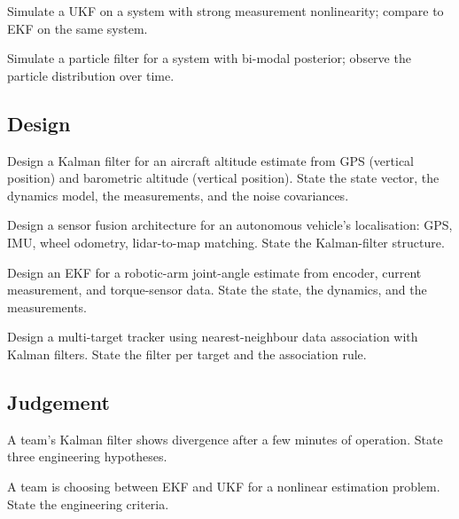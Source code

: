 \begin{exercise}
Simulate a UKF on a system with strong measurement nonlinearity; compare to EKF on the same system.
\end{exercise}

\begin{exercise}
Simulate a particle filter for a system with bi-modal posterior; observe the particle distribution over time.
\end{exercise}

\subsection*{Design}

\begin{exercise}
Design a Kalman filter for an aircraft altitude estimate from GPS (vertical position) and barometric altitude (vertical position). State the state vector, the dynamics model, the measurements, and the noise covariances.
\end{exercise}

\begin{exercise}
Design a sensor fusion architecture for an autonomous vehicle's localisation: GPS, IMU, wheel odometry, lidar-to-map matching. State the Kalman-filter structure.
\end{exercise}

\begin{exercise}
Design an EKF for a robotic-arm joint-angle estimate from encoder, current measurement, and torque-sensor data. State the state, the dynamics, and the measurements.
\end{exercise}

\begin{exercise}
Design a multi-target tracker using nearest-neighbour data association with Kalman filters. State the filter per target and the association rule.
\end{exercise}

\subsection*{Judgement}

\begin{exercise}
A team's Kalman filter shows divergence after a few minutes of operation. State three engineering hypotheses.
\end{exercise}

\begin{exercise}
A team is choosing between EKF and UKF for a nonlinear estimation problem. State the engineering criteria.
\end{exercise}

